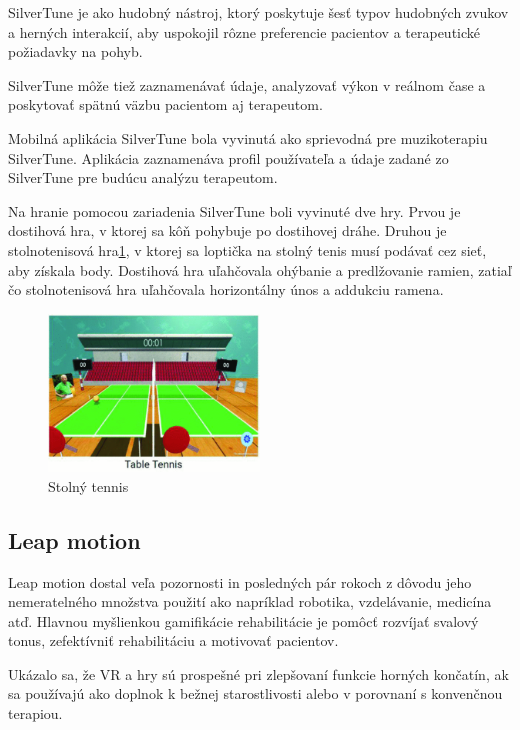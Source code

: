\documentclass[10pt,twoside,slovak,a4paper]{article}
\begin{document}
SilverTune je ako hudobný nástroj, ktorý poskytuje šesť typov hudobných zvukov a herných interakcií, aby uspokojil rôzne preferencie pacientov a terapeutické požiadavky na pohyb. 

SilverTune môže tiež zaznamenávať údaje, analyzovať výkon v reálnom čase a poskytovať spätnú väzbu pacientom aj terapeutom.

Mobilná aplikácia SilverTune bola vyvinutá ako sprievodná pre muzikoterapiu SilverTune. Aplikácia zaznamenáva profil používateľa a údaje zadané zo SilverTune pre budúcu analýzu terapeutom. 

Na hranie pomocou zariadenia SilverTune boli vyvinuté dve hry. Prvou je dostihová hra, v ktorej sa kôň pohybuje po dostihovej dráhe. Druhou je stolnotenisová hra\ref{fig:SilverTune Stolný tennis}, v ktorej sa loptička na stolný tenis musí podávať cez sieť, aby získala body. Dostihová hra uľahčovala ohýbanie a predlžovanie ramien, zatiaľ čo stolnotenisová hra uľahčovala horizontálny únos a addukciu ramena.\cite{9483850}

\begin{figure}[ht]
    \centering
    \includegraphics[width = 0.5\textwidth]{obrazky/table_tennnis.png}
    \caption{Stolný tennis}
    \label{fig:SilverTune Stolný tennis}
\end{figure}


\subsection{Leap motion}
Leap motion dostal veľa pozornosti in posledných pár rokoch z dôvodu jeho nemeratelného množstva použití ako napríklad robotika, vzdelávanie, medicína atď. Hlavnou myšlienkou gamifikácie rehabilitácie je pomôcť rozvíjať svalový tonus, zefektívniť rehabilitáciu a motivovať pacientov.

Ukázalo sa, že VR a hry sú prospešné pri zlepšovaní funkcie horných končatín, ak sa používajú ako doplnok k bežnej starostlivosti alebo v porovnaní s konvenčnou terapiou.
\end{document}
